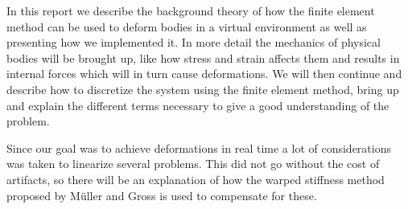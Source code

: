 In this report we describe the background theory of how the finite element method can be used to deform bodies in a virtual environment as well as presenting how we implemented it. In more detail the mechanics of physical bodies will be brought up, like how stress and strain affects them and results in internal forces which will in turn cause deformations. We will then continue and describe how to discretize the system using the finite element method, bring up and explain the different terms necessary to give a good understanding of the problem. 

Since our goal was to achieve deformations in real time a lot of considerations was taken to linearize several problems. This did not go without the cost of artifacts, so there will be an explanation of how the warped stiffness method proposed by M\"uller and Gross \cite{muller_ivm} is used to compensate for these.